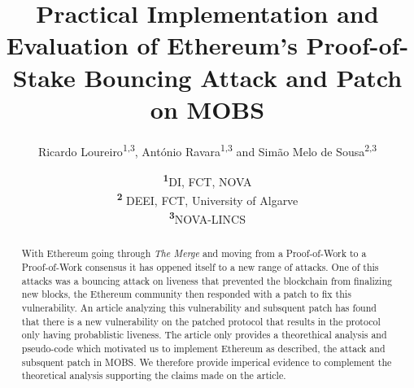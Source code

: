 \documentclass[11pt,a4paper]{article}
\begin{document}
\title{Practical Implementation and Evaluation of Ethereum's Proof-of-Stake Bouncing Attack and Patch on MOBS } %

\author{%
	Ricardo Loureiro\textsuperscript{1,3}, António Ravara\textsuperscript{1,3} and Simão Melo de Sousa\textsuperscript{2,3}
}

\date{\footnotesize\textsuperscript{\textbf{1}}DI, FCT, NOVA\\ \textsuperscript{\textbf{2}} DEEI, FCT, University of Algarve \\ \textsuperscript{\textbf{3}}NOVA-LINCS}

\maketitle %

\begin{abstract}
	\noindent With Ethereum going through \textit{The Merge} and moving from a Proof-of-Work to a Proof-of-Work consensus
						it has oppened itself to a new range of attacks. One of this attacks was a bouncing attack on liveness that
						prevented the blockchain from finalizing new blocks, the Ethereum community then responded with a patch to fix
						this vulnerability. An article analyzing this vulnerability and subsquent patch has found that there is a new
						vulnerability on the patched protocol that results in the protocol only having probablistic liveness. The article
						only provides a theorethical analysis and pseudo-code which motivated us to implement Ethereum as described, the attack
						and subsquent patch in MOBS. We therefore provide imperical evidence to complement the theoretical analysis supporting the
						claims made on the article.
\end{abstract}



\end{document}
